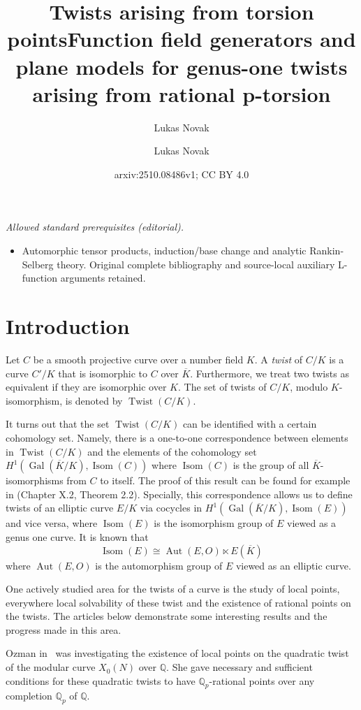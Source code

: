 \documentclass[a4paper, 12pt]{amsart}
\author{Lukas Novak}
\title[Twists arising from torsion points]{Twists arising from torsion points}
\title{Function field generators and plane models for genus-one twists arising from rational p-torsion}
\author{Lukas Novak}
\date{arxiv:2510.08486v1; CC BY 4.0}
\theoremstyle{definition}
\theoremstyle{remark}
\newcommand{\GalK}{\operatorname{Gal}(\overline{K}/K)}
\newcommand{\whichbold}[1]{\mathbb{#1}} %
\newcommand{\Q}{\whichbold{Q}}
\newcommand{\Qp}{\whichbold{Q}_{p}}
\numberwithin{equation}{section}
\begin{document}
\maketitle
\noindent\textit{Allowed standard prerequisites (editorial).}\begin{itemize}
\item Automorphic tensor products, induction/base change and analytic Rankin-Selberg theory. Original complete bibliography and source-local auxiliary L-function arguments retained.
\end{itemize}\medskip
\section{Introduction}\label{sec:1}

Let $C$ be a smooth projective curve over a number field $K$. A \emph{twist} of $C/K$ is a curve $C'/K$ that is isomorphic to $C$ over $\overline{K}$. Furthermore,  we treat two twists as equivalent if they are isomorphic over $K$. The set of twists of $C/K$, modulo $K$-isomorphism, is denoted by $\operatorname{Twist}(C/K)$.

It turns out that the set $\operatorname{Twist}(C/K)$ can be identified with a certain cohomology set.
Namely, there is a one-to-one correspondence between elements in $\operatorname{Twist}(C/K)$ and the elements of the cohomology set $H^1\left(\GalK,\operatorname{Isom}(C)\right)$ where $\operatorname{Isom}(C)$ is the group of all $\overline{K}$-isomorphisms from $C$ to itself.
The proof of this result can be found for example in \cite{silverman2009arithmetic} (Chapter X.2, Theorem 2.2). Specially, this correspondence allows us to define twists of an elliptic curve $E/K$ via cocycles in $H^1\left(\GalK,\operatorname{Isom}(E)\right)$ and vice versa, where $\operatorname{Isom}(E)$ is the isomorphism group of $E$ viewed as a genus one curve. It is known that
\[
    \operatorname{Isom}(E) \cong \operatorname{Aut}(E,O) \ltimes E(\overline{K})
\]
where $\operatorname{Aut}(E,O)$ is the automorphism group of $E$ viewed as an elliptic curve.

One actively studied area for the twists of a curve is the study of local points, everywhere local solvability of these twist and the existence of rational points on the twists.  
The articles below demonstrate some interesting results and the progress made in this area.

Ozman in~\cite{MR2890545} was investigating the existence of local points on the quadratic twist of the modular curve $X_0(N)$ over $\Q$. She gave necessary and sufficient conditions for these quadratic twists to have $\Qp$-rational points over any completion $\Qp$ of $\Q$.
\end{document}
